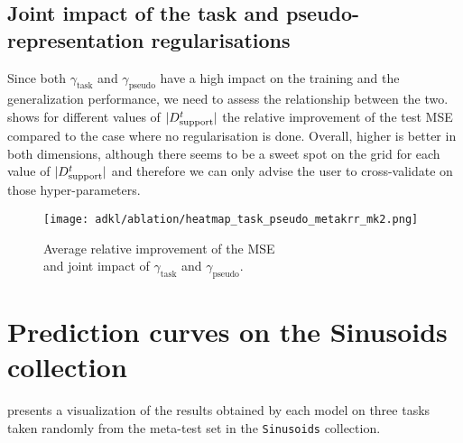
\subsection{Joint impact of the task and pseudo-representation regularisations}
\label{app:ablation-task-pseudo}

Since both $\gamma_\mathrm{task}$ and $\gamma_\mathrm{pseudo}$ have a high impact on the training and the generalization performance, we need to assess the relationship between the two.
 shows for different values of $|{D_{\mathrm{support}}^t}|$ the relative improvement of the test MSE compared to the case where no regularisation is done.
Overall, higher is better in both dimensions, although there seems to be a sweet spot on the grid for each value of $|{D_{\mathrm{support}}^t}|$ and therefore we can only advise the user to cross-validate on those hyper-parameters.


\begin{figure}[ht]
    \centering
    \texttt{[image: adkl/ablation/heatmap\_task\_pseudo\_metakrr\_mk2.png]}
    \caption{Average relative improvement of the MSE\\and joint impact of $\gamma_\mathrm{task}$ and $\gamma_\mathrm{pseudo}$.}
    \label{fig:app-pseudo-task}
\end{figure}


\clearpage
\section{Prediction curves on the Sinusoids collection}
\label{app:predictions}

 presents a visualization of the results obtained by each model on three tasks taken randomly from the meta-test set in the \texttt{Sinusoids} collection.

